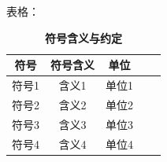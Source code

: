 \documentclass[zihao=5,UTF8]{report}
\theoremstyle{MyTheoremStyle} %
\theoremstyle{MySubsubsectionStyle} %
\begin{document}
表格：

\begin{table}[H]
    \centering
    \caption{\textbf{符号含义与约定}}
    \label{tab:waterpump}
    \begin{tabular}{ccccc}
    \toprule
    符号 & 符号含义& 单位\\
    \midrule
    符号1& 含义1& 单位1\\
    符号2& 含义2& 单位2\\
    符号3& 含义3& 单位3\\
    符号4& 含义4& 单位4\\
    \bottomrule
    \end{tabular}
\end{table}


\nocite{*}

\thispagestyle{fancy} 
\end{document}
